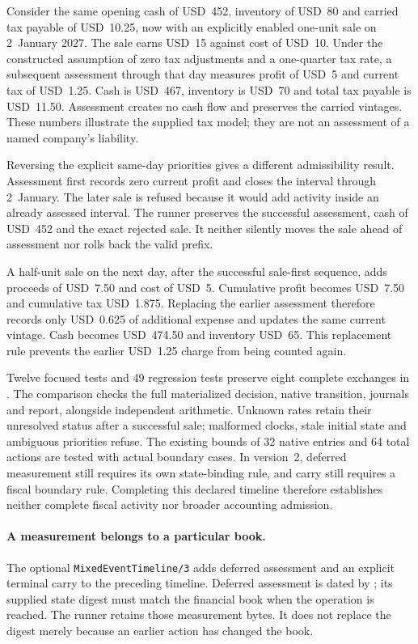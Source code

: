 Consider the same opening cash of USD~452, inventory of USD~80 and carried tax
payable of USD~10.25, now with an explicitly enabled one-unit sale on
2~January 2027. The sale earns USD~15 against cost of USD~10. Under the
constructed assumption of zero tax adjustments and a one-quarter tax rate,
a subsequent assessment through that day measures profit of USD~5 and current
tax of USD~1.25. Cash is USD~467, inventory is USD~70 and total tax payable is
USD~11.50. Assessment creates no cash flow and preserves the carried vintages.
These numbers illustrate the supplied tax model; they are not an assessment
of a named company's liability.

Reversing the explicit same-day priorities gives a different admissibility
result. Assessment first records zero current profit and closes the interval
through 2~January. The later sale is refused because it would add activity
inside an already assessed interval. The runner preserves the successful
assessment, cash of USD~452 and the exact rejected sale. It neither silently
moves the sale ahead of assessment nor rolls back the valid prefix.

A half-unit sale on the next day, after the successful sale-first sequence,
adds proceeds of USD~7.50 and cost of USD~5. Cumulative profit becomes USD~7.50
and cumulative tax USD~1.875. Replacing the earlier assessment therefore
records only USD~0.625 of additional expense and updates the same current
vintage. Cash becomes USD~474.50 and inventory USD~65. This replacement rule
prevents the earlier USD~1.25 charge from being counted again.

Twelve focused tests and 49 regression tests preserve eight complete exchanges
in . The comparison
checks the full materialized decision, native transition, journals and report,
alongside independent arithmetic. Unknown rates retain their unresolved
status after a successful sale; malformed clocks, stale initial state and
ambiguous priorities refuse. The existing bounds of 32 native entries and
64 total actions are tested with actual boundary cases. In version~2, deferred measurement
still requires its own state-binding rule, and carry still requires a fiscal
boundary rule. Completing this declared timeline therefore establishes neither
complete fiscal activity nor broader accounting admission.


\paragraph{A measurement belongs to a particular book.}
The optional \texttt{MixedEventTimeline/3} adds deferred assessment and an
explicit terminal carry to the preceding timeline. Deferred assessment is
dated by ; its supplied state digest must match the
financial book when the operation is reached. The runner retains those
measurement bytes. It does not replace the digest merely because an earlier
action has changed the book.

